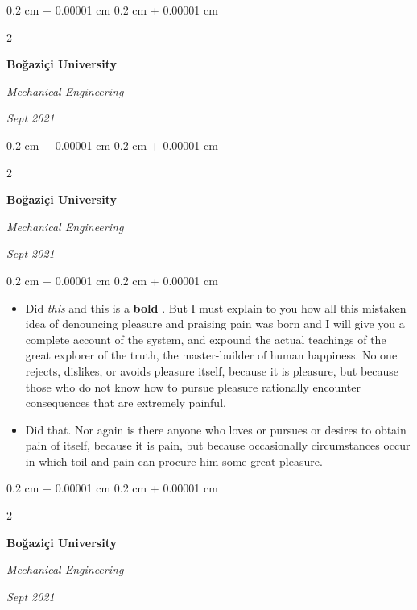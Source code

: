 \documentclass[10pt, letterpaper]{article}
\newenvironment{highlights}{
    \begin{itemize}[
        topsep=0.10 cm,
        parsep=0.10 cm,
        partopsep=0pt,
        itemsep=0pt,
        leftmargin=0.4 cm + 10pt
    ]
}{
    \end{itemize}
} %
\newenvironment{onecolentry}{
    \begin{adjustwidth}{
        0.2 cm + 0.00001 cm
    }{
        0.2 cm + 0.00001 cm
    }
}{
    \end{adjustwidth}
} %
\newenvironment{twocolentry}[2][]{
    \onecolentry
    \def\secondColumn{#2}
    \setcolumnwidth{\fill, 4.5 cm}
    \begin{paracol}{2}
}{
    \switchcolumn \raggedleft \secondColumn
    \end{paracol}
    \endonecolentry
} %
\let\hrefWithoutArrow\href
\renewcommand{\href}[2]{\hrefWithoutArrow{#1}{\ifthenelse{\equal{#2}{}}{ }{#2 }\raisebox{.15ex}{\footnotesize \faExternalLink*}}}
\begin{document}
        \vspace{0.2 cm}

        \begin{twocolentry}{
            
            
        \textit{Sept 2021}}
            \textbf{Boğaziçi University}

            \textit{Mechanical Engineering}
        \end{twocolentry}



        \vspace{0.2 cm}

        \begin{twocolentry}{
            
            
        \textit{Sept 2021}}
            \textbf{Boğaziçi University}

            \textit{Mechanical Engineering}
        \end{twocolentry}

        \vspace{0.10 cm}
        \begin{onecolentry}
            \begin{highlights}
                \item Did \textit{this} and this is a \textbf{bold} \href{https://example.com}{link}. But I must explain to you how all this mistaken idea of denouncing pleasure and praising pain was born and I will give you a complete account of the system, and expound the actual teachings of the great explorer of the truth, the master-builder of human happiness. No one rejects, dislikes, or avoids pleasure itself, because it is pleasure, but because those who do not know how to pursue pleasure rationally encounter consequences that are extremely painful.
                \item Did that. Nor again is there anyone who loves or pursues or desires to obtain pain of itself, because it is pain, but because occasionally circumstances occur in which toil and pain can procure him some great pleasure.
            \end{highlights}
        \end{onecolentry}


        \vspace{0.2 cm}

        \begin{twocolentry}{
            
            
        \textit{Sept 2021}}
            \textbf{Boğaziçi University}

            \textit{Mechanical Engineering}
        \end{twocolentry}
\end{document}
